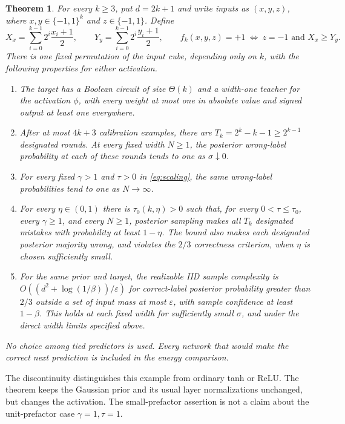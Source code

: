 \documentclass[11pt]{article}
\newtheorem{theorem}{Theorem}
\begin{document}
\begin{theorem}\label{thm:main}
For every $k\ge3$, put $d=2k+1$ and write inputs as $(x,y,z)$, where
$x,y\in\{-1,1\}^k$ and $z\in\{-1,1\}$. Define
\[
 X_x=\sum_{i=0}^{k-1}2^i\frac{x_i+1}{2},\qquad
 Y_y=\sum_{i=0}^{k-1}2^i\frac{y_i+1}{2},\qquad
 f_k(x,y,z)=+1\ \Longleftrightarrow\ z=-1\text{ and }X_x\ge Y_y.
\]
There is one fixed permutation of the input cube, depending only on $k$,
with the following properties for either activation.
\begin{enumerate}
\item The target has a Boolean circuit of size $\Theta(k)$ and a
width-one teacher for the activation $\phi$, with every weight at most
one in absolute value and signed output at least one everywhere.
\item After at most $4k+3$ calibration examples, there are
$T_k=2^k-k-1\ge2^{k-1}$ designated rounds. At every fixed width
$N\ge1$, the posterior wrong-label probability at each of these rounds
tends to one as $\sigma\downarrow0$.
\item For every fixed $\gamma>1$ and $\tau>0$ in
\eqref{eq:scaling}, the same wrong-label probabilities tend to one as
$N\to\infty$.
\item For every $\eta\in(0,1)$ there is $\tau_0(k,\eta)>0$ such that,
for every $0<\tau\le\tau_0$, every $\gamma\ge1$, and every $N\ge1$,
posterior sampling makes all $T_k$ designated mistakes with probability
at least $1-\eta$. The bound also makes each designated posterior
majority wrong, and violates the $2/3$ correctness criterion, when
$\eta$ is chosen sufficiently small.
\item For the same prior and target, the realizable IID sample complexity
is $O((d^2+\log(1/\beta))/\varepsilon)$ for correct-label posterior
probability greater than $2/3$ outside a set of input mass at most
$\varepsilon$, with sample confidence at least $1-\beta$.
This holds at each fixed width for sufficiently small $\sigma$, and
under the direct width limits specified above.
\end{enumerate}
No choice among tied predictors is used. Every network that would make
the correct next prediction is included in the energy comparison.
\end{theorem}

The discontinuity distinguishes this example from ordinary tanh or ReLU.
The theorem keeps the Gaussian prior and its usual layer normalizations
unchanged, but changes the activation. The small-prefactor assertion is
not a claim about the unit-prefactor case $\gamma=1,\tau=1$.
\end{document}
